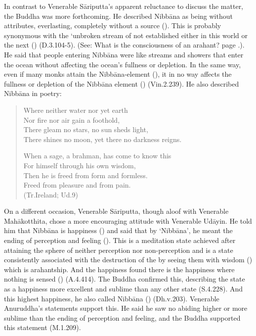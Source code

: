 In contrast to Venerable Sāriputta's apparent reluctance to discuss the matter, the Buddha was more forthcoming. He described Nibbāna as being  without attributes, everlasting, completely without a source (). This is probably synonymous with the `unbroken stream of  not established either in this world or the next () (D.3.104-5). (See: What is the consciousness of an arahant? page \pageref{arahant-consciousness}.). He said that people entering Nibbāna were like streams and showers that enter the ocean without affecting the ocean's fullness or depletion. In the same way, even if many monks attain the Nibbāna-element (), it in no way affects the fullness or depletion of the Nibbāna element () (Vin.2.239). He also described Nibbāna in poetry:

\begin{verse}
Where neither water nor yet earth\\
Nor fire nor air gain a foothold,\\
There gleam no stars, no sun sheds light,\\
There shines no moon, yet there no darkness reigns.

When a sage, a brahman, has come to know this\\
For himself through his own wisdom,\\
Then he is freed from form and formless.\\
Freed from pleasure and from pain.\\
(Tr.Ireland; Ud.9)
\end{verse}

On a different occasion, Venerable Sāriputta, though aloof with Venerable Mahākotthita, chose a more encouraging attitude with Venerable Udāyin. He told him that Nibbāna is happiness () and said that by `Nibbāna', he meant the ending of perception and feeling (). This is a meditation state achieved after attaining the sphere of neither perception nor non-perception and is a state consistently associated with the destruction of the  by seeing them with wisdom () which is arahantship. And the happiness found there is the happiness where nothing is sensed () (A.4.414). The Buddha confirmed this, describing the state as a happiness more excellent and sublime than any other state (S.4.228). And this highest happiness, he also called Nibbāna () (Dh.v.203). Venerable Anuruddha's statements support this. He said he saw no abiding higher or more sublime than the ending of perception and feeling, and the Buddha supported this statement (M.1.209).

